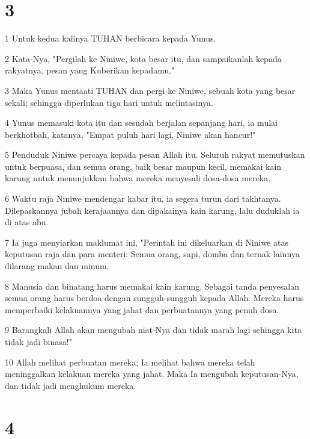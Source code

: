 \chapter{3}

\par 1 Untuk kedua kalinya TUHAN berbicara kepada Yunus.
\par 2 Kata-Nya, "Pergilah ke Niniwe, kota besar itu, dan sampaikanlah kepada rakyatnya, pesan yang Kuberikan kepadamu."
\par 3 Maka Yunus mentaati TUHAN dan pergi ke Niniwe, sebuah kota yang besar sekali; sehingga diperlukan tiga hari untuk melintasinya.
\par 4 Yunus memasuki kota itu dan sesudah berjalan sepanjang hari, ia mulai berkhotbah, katanya, "Empat puluh hari lagi, Niniwe akan hancur!"
\par 5 Penduduk Niniwe percaya kepada pesan Allah itu. Seluruh rakyat memutuskan untuk berpuasa, dan semua orang, baik besar maupun kecil, memakai kain karung untuk menunjukkan bahwa mereka menyesali dosa-dosa mereka.
\par 6 Waktu raja Niniwe mendengar kabar itu, ia segera turun dari takhtanya. Dilepaskannya jubah kerajaannya dan dipakainya kain karung, lalu duduklah ia di atas abu.
\par 7 Ia juga menyiarkan maklumat ini, "Perintah ini dikeluarkan di Niniwe atas keputusan raja dan para menteri: Semua orang, sapi, domba dan ternak lainnya dilarang makan dan minum.
\par 8 Manusia dan binatang harus memakai kain karung. Sebagai tanda penyesalan semua orang harus berdoa dengan sungguh-sungguh kepada Allah. Mereka harus memperbaiki kelakuannya yang jahat dan perbuatannya yang penuh dosa.
\par 9 Barangkali Allah akan mengubah niat-Nya dan tidak marah lagi sehingga kita tidak jadi binasa!"
\par 10 Allah melihat perbuatan mereka; Ia melihat bahwa mereka telah meninggalkan kelakuan mereka yang jahat. Maka Ia mengubah keputusan-Nya, dan tidak jadi menghukum mereka.

\chapter{4}

